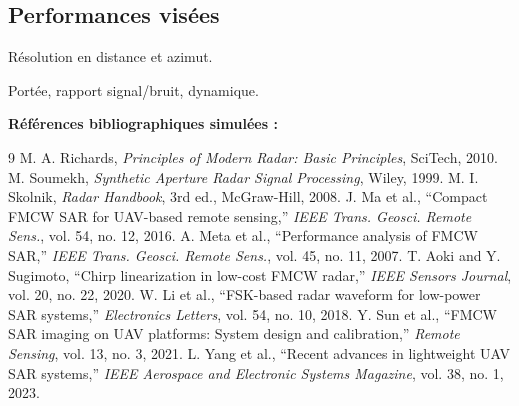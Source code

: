 \subsection{Performances visées}

Résolution en distance et azimut.

Portée, rapport signal/bruit, dynamique.


\bigskip
\noindent\textbf{Références bibliographiques simulées :}
\begin{thebibliography}{9}
 M. A. Richards, \textit{Principles of Modern Radar: Basic Principles}, SciTech, 2010.
 M. Soumekh, \textit{Synthetic Aperture Radar Signal Processing}, Wiley, 1999.
 M. I. Skolnik, \textit{Radar Handbook}, 3rd ed., McGraw-Hill, 2008.
 J. Ma et al., “Compact FMCW SAR for UAV-based remote sensing,” \textit{IEEE Trans. Geosci. Remote Sens.}, vol. 54, no. 12, 2016.
 A. Meta et al., “Performance analysis of FMCW SAR,” \textit{IEEE Trans. Geosci. Remote Sens.}, vol. 45, no. 11, 2007.
 T. Aoki and Y. Sugimoto, “Chirp linearization in low-cost FMCW radar,” \textit{IEEE Sensors Journal}, vol. 20, no. 22, 2020.
 W. Li et al., “FSK-based radar waveform for low-power SAR systems,” \textit{Electronics Letters}, vol. 54, no. 10, 2018.
 Y. Sun et al., “FMCW SAR imaging on UAV platforms: System design and calibration,” \textit{Remote Sensing}, vol. 13, no. 3, 2021.
 L. Yang et al., “Recent advances in lightweight UAV SAR systems,” \textit{IEEE Aerospace and Electronic Systems Magazine}, vol. 38, no. 1, 2023.
\end{thebibliography}